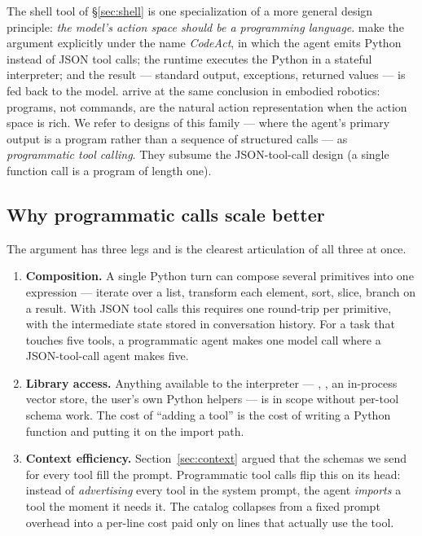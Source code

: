 The shell tool of \S\ref{sec:shell} is one specialization of a more
general design principle: \emph{the model's action space should be a
programming language}. \citet{wang2024codeact} make the argument
explicitly under the name \emph{CodeAct}, in which the agent emits
Python instead of JSON tool calls; the runtime executes the Python
in a stateful interpreter; and the result --- standard output,
exceptions, returned values --- is fed back to the model.
\citet{liang2023codeaspolicies} arrive at the same conclusion in
embodied robotics: programs, not commands, are the natural action
representation when the action space is rich. We refer to designs
of this family --- where the agent's primary output is a program
rather than a sequence of structured calls --- as
\emph{programmatic tool calling}. They subsume the JSON-tool-call
design (a single function call is a program of length one).

\subsection{Why programmatic calls scale better}
\label{sec:codeact-why}

The argument has three legs and \citet{anthropic2025mcpcode} is the
clearest articulation of all three at once.

\begin{enumerate}[label=(\arabic*),leftmargin=2em,itemsep=0.4em]
\item \textbf{Composition.} A single Python turn can compose several
  primitives into one expression --- iterate over a list, transform
  each element, sort, slice, branch on a result. With JSON tool
  calls this requires one round-trip per primitive, with the
  intermediate state stored in conversation history. For a task
  that touches five tools, a programmatic agent makes one model call
  where a JSON-tool-call agent makes five.
\item \textbf{Library access.} Anything available to the interpreter
  --- , , an in-process vector store, the
  user's own Python helpers --- is in scope without per-tool schema
  work. The cost of ``adding a tool'' is the cost of writing a
  Python function and putting it on the import path.
\item \textbf{Context efficiency.}
  Section~\ref{sec:context} argued that the schemas we send for
  every tool fill the prompt. Programmatic tool calls flip this on
  its head: instead of \emph{advertising} every tool in the system
  prompt, the agent \emph{imports} a tool the moment it needs it.
  The catalog collapses from a fixed prompt overhead into a
  per-line cost paid only on lines that actually use the tool.
\end{enumerate}

